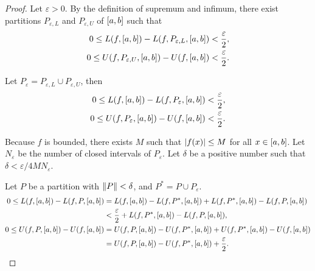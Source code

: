 \begin{proof}
    Let $\varepsilon > 0$. By the definition of supremum and infimum, there exist partitions $P_{\varepsilon, L}$ and $P_{\varepsilon, U}$ of $\left[{a,b}\right]$ such that
    \[
        \begin{split}
            0 \leq L(f, \left[{a, b}\right]) - L(f, P_{\varepsilon, L}, \left[{a, b}\right]) < \frac{\varepsilon}{2}, \\
            0 \leq U(f, P_{\varepsilon, U}, \left[{a, b}\right]) - U(f, \left[{a, b}\right]) < \frac{\varepsilon}{2}.
        \end{split}
    \]

    Let $P_{\varepsilon} = P_{\varepsilon, L}\cup P_{\varepsilon, U}$, then
    \[
        \begin{split}
            0 \leq L(f, \left[{a, b}\right]) - L(f, P_{\varepsilon}, \left[{a, b}\right]) < \frac{\varepsilon}{2}, \\
            0 \leq U(f, P_{\varepsilon}, \left[{a, b}\right]) - U(f, \left[{a, b}\right]) < \frac{\varepsilon}{2}.
        \end{split}
    \]

    Because $f$ is bounded, there exists $M$ such that $\left\vert{f(x)}\right\vert\leq M$ for all $x\in\left[{a, b}\right]$. Let $N_{\varepsilon}$ be the number of closed intervals of $P_{\varepsilon}$. Let $\delta$ be a positive number such that $\delta < \varepsilon/4MN_{\varepsilon}$.

    Let $P$ be a partition with $\left\Vert{P}\right\Vert < \delta$, and $P^{*} = P\cup P_{\varepsilon}$.
    \begin{align*}
        0 \leq L(f, \left[{a, b}\right]) - L(f, P, \left[{a, b}\right]) & = L(f, \left[{a, b}\right]) - L(f, P^{*}, \left[{a, b}\right]) + L(f, P^{*}, \left[{a, b}\right]) - L(f, P, \left[{a, b}\right]) \\
                                                                            & < \frac{\varepsilon}{2} + L(f, P^{*}, \left[{a, b}\right]) - L(f, P, \left[{a, b}\right]),                                           \\
        0 \leq U(f, P, \left[{a, b}\right]) - U(f, \left[{a, b}\right]) & = U(f, P, \left[{a, b}\right]) - U(f, P^{*}, \left[{a, b}\right]) + U(f, P^{*}, \left[{a, b}\right]) - U(f, \left[{a, b}\right]) \\
                                                                            & = U(f, P, \left[{a, b}\right]) - U(f, P^{*}, \left[{a, b}\right]) + \frac{\varepsilon}{2}.
    \end{align*}


\end{proof}
